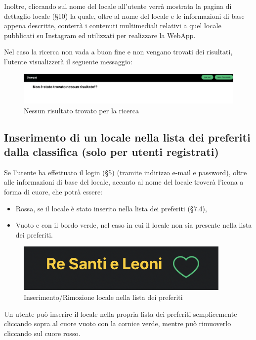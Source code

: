 Inoltre, cliccando sul nome del locale all’utente verrà mostrata la pagina di dettaglio locale (\S{10}) la quale, oltre al nome del locale e le informazioni di base appena descritte, conterrà i contenuti multimediali relativi a quel locale pubblicati su Instagram ed utilizzati per realizzare la WebApp.

Nel caso la ricerca non vada a buon fine e non vengano trovati dei risultati, l’utente visualizzerà il seguente messaggio:

\begin{figure}[H]
\centering
\includegraphics[scale=0.3]{./images/Ricerca/ZeroRisultati.png} 
\caption{Nessun risultato trovato per la ricerca}
\end{figure}

\subsection{Inserimento di un locale nella lista dei preferiti dalla classifica (solo per utenti registrati)}

Se l’utente ha effettuato il login (\S{5}) (tramite indirizzo e-mail e password), oltre alle informazioni di base del locale, accanto al nome del locale troverà l’icona a forma di cuore, che potrà essere:

\begin{itemize}
\item Rossa, se il locale è stato inserito nella lista dei preferiti (\S{7.4}),
\item Vuoto e con il bordo verde, nel caso in cui il locale non sia presente nella lista dei preferiti.
\end{itemize}

\begin{figure}[H]
\centering
\includegraphics[scale=0.6]{./images/Ricerca/Cuore.png} 
\caption{Inserimento/Rimozione locale nella lista dei preferiti}
\end{figure}

Un utente può inserire il locale nella propria lista dei preferiti semplicemente cliccando sopra al cuore vuoto con la cornice verde, mentre può rimuoverlo cliccando sul cuore rosso.

